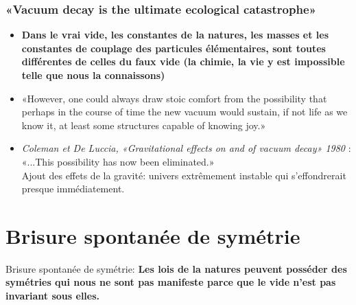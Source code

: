 \documentclass{beamer}
\begin{document}
\begin{frame}
\frametitle{«Vacuum decay is the ultimate ecological catastrophe»}
\begin{itemize}
\item \textbf{Dans le vrai vide, les constantes de la natures, les masses et les constantes de couplage des particules élémentaires, sont toutes différentes de celles du faux vide (la chimie, la vie y est impossible telle que nous la connaissons)}
\item «However, one could always draw stoic comfort from the possibility that perhaps in the course of time the new vacuum would sustain, if not life as we know it, at least some structures capable of knowing joy.» 
\item \textit{ Coleman et De Luccia, «Gravitational effects on and of vacuum decay» 1980} :\\
     «...This possibility has now been eliminated.»\\
     Ajout des effets de la gravité: univers extrêmement instable qui s'effondrerait presque immédiatement.
\end{itemize}
\end{frame}




\section{Brisure spontanée de symétrie}


\begin{frame}
\begin{block}{Brisure spontanée de symétrie:}
\textbf{Les lois de la natures peuvent posséder des symétries qui nous ne sont pas manifeste parce que le vide n'est pas invariant sous elles.}
\end{block}
\end{frame}
\end{document}
